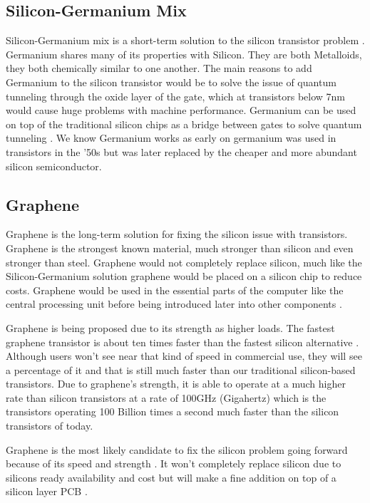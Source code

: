 \documentclass[journal]{IEEEtran}
\begin{document}
\subsection{Silicon-Germanium Mix}
Silicon-Germanium mix is a short-term solution to the silicon transistor problem \cite{8947469320180101}. Germanium shares many of its properties with Silicon. They are both Metalloids, they both chemically similar to one another. The main reasons to add Germanium to the silicon transistor would be to solve the issue of quantum tunneling through the oxide layer of the gate, which at transistors below 7nm would cause huge problems with machine performance. Germanium can be used on top of the traditional silicon chips as a bridge between gates to solve quantum tunneling \cite{ye_2016}. We know Germanium works as early on germanium was used in transistors in the '50s but was later replaced by the cheaper and more abundant silicon semiconductor. 

\subsection{Graphene}
Graphene is the long-term solution for fixing the silicon issue with transistors. Graphene is the strongest known material, much stronger than silicon and even stronger than steel. Graphene would not completely replace silicon, much like the Silicon-Germanium solution graphene would be placed on a silicon chip to reduce costs. Graphene would be used in the essential parts of the computer like the central processing unit before being introduced later into other components \cite{48600520130101}.

Graphene is being proposed due to its strength as higher loads. The fastest graphene transistor is about ten times faster than the fastest silicon alternative \cite{bourzac_2010}. Although users won't see near that kind of speed in commercial use, they will see a percentage of it and that is still much faster than our traditional silicon-based transistors. Due to graphene's strength, it is able to operate at a much higher rate than silicon transistors at a rate of 100GHz (Gigahertz) which is the transistors operating 100 Billion times a second much faster than the silicon transistors of today.

Graphene is the most likely candidate to fix the silicon problem going forward because of its speed and strength \cite{VanNoorden2006}. It won't completely replace silicon due to silicons ready availability and cost but will make a fine addition on top of a silicon layer PCB \cite{S016943321731100520170831}. 
\end{document}
